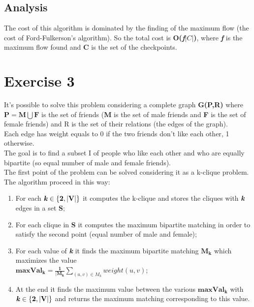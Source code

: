 \documentclass[11pt]{article}
\begin{document}
\subsection{Analysis}
The cost of this algorithm is dominated by the finding of the maximum
flow (the cost of Ford-Fulkerson’s algorithm). So the total cost is \textbf{O(\textit{f}$|C|$)}, where \textit{\textbf{f}} is the maximum flow found and \textbf{C} is the set of the checkpoints.

\section{Exercise 3}
It's possible to solve this problem considering a complete graph \textbf{G(P,R)} where $\mathbf{P = M \bigcup F}$ is the set of friends (\textbf{M} is the set of male friends and \textbf{F} is the set of female friends) and R is the set of their relations (the edges of the graph). \\
Each  edge
has weight equals to 0 if the two friends don’t like each other, 1 otherwise. \\
The goal is to find a subset I of people who
like each other and who are equally bipartite (so equal number of male and
female friends). \\
The first point of the problem can be solved considering it as a k-clique problem. The algorithm proceed in this way:
\begin{enumerate}
	\item For each $\mathbf{\textbf{\textit{k}} \in \{2,|V|\}}$ it computes the k-clique and stores the cliques with \textbf{\textit{k}} edges in a set \textbf{S};
	\item For each clique in \textbf{S} it computes the maximum bipartite matching in order to satisfy the second point (equal number of male and female);
	\item For each value of \textbf{\textit{k}} it finds the maximum bipartite matching $\mathbf{M_{k}}$ which maximizes the value \\
	$\mathbf{maxVal_{k} = \frac{1}{|M_{k}}} \sum_{(u,v) \in M_{k}}weight(u,v)$;
	\item At the end it finds the maximum value between the various $\mathbf{maxVal_{k}}$ with $\mathbf{\textbf{\textit{k}} \in \{2,|V|\}}$ and returns the maximum matching corresponding to this value.
\end{enumerate}
\end{document}
